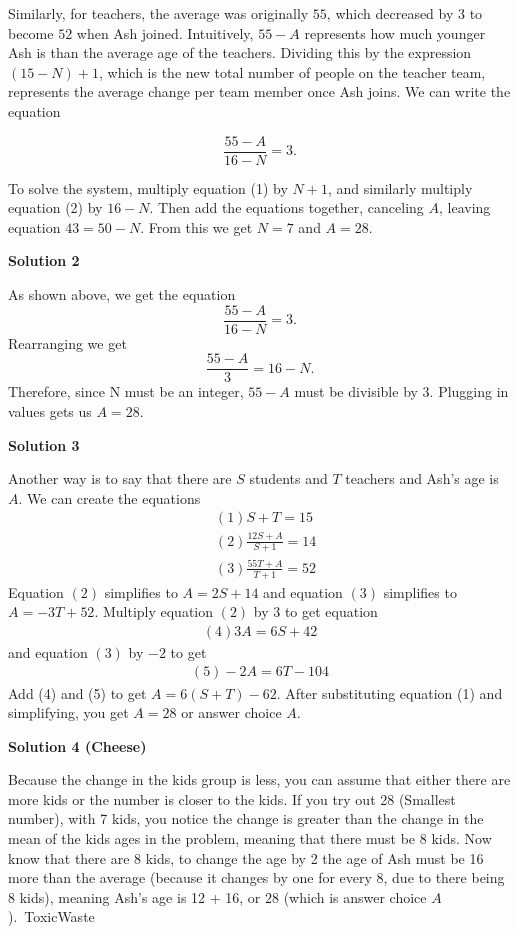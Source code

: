 \begin{enumerate}
 Similarly, for teachers, the average was originally $55$, which decreased by $3$ to become $52$ when Ash joined. Intuitively, $55-A$ represents how much younger Ash is than the average age of the teachers. Dividing this by the expression $(15-N)+1$, which is the new total number of people on the teacher team, represents the average change per team member once Ash joins. We can write the equation

 
 \[\frac{55-A}{16-N} = 3.\]

 To solve the system, multiply equation (1) by $N+1$, and similarly multiply equation (2) by $16-N$. Then add the equations together, canceling $A$, leaving equation $43=50-N$. From this we get $N=7$ and $A= \boxed{28}.$




\textbf{Solution 2}

As shown above, we get the equation 
 \[\frac{55-A}{16-N} = 3.\] Rearranging we get 
 \[\frac{55-A}{3} = 16-N.\] Therefore, since N must be an integer, $55-A$ must be divisible by 3. Plugging in values gets us $A= \boxed{28}.$




\textbf{Solution 3}

Another way is to say that there are $S$ students and $T$ teachers and Ash's age is $A$. We can create the equations\begin{align}&(1) S+T=15 \\&(2) \frac{12S+A}{S+1}=14 \\ &(3) \frac{55T+A}{T+1}=52\end{align}Equation $(2)$ simplifies to $A=2S+14$ and equation $(3)$ simplifies to $A=-3T+52$. Multiply equation $(2)$ by $3$ to get equation \begin{align} (4) 3A=6S+42 \end{align} and equation $(3)$ by $-2$ to get \begin{align}(5) -2A=6T-104 \end{align} Add (4) and (5) to get $A=6(S+T)-62$. After substituting equation (1) and simplifying, you get $A=\boxed{28}$ or answer choice $\boxed{A}$.

 



\textbf{Solution 4 (Cheese)}

Because the change in the kids group is less, you can assume that either there are more kids or the number is closer to the kids. If you try out 28 (Smallest number), with 7 kids, you notice the change is greater than the change in the mean of the kids ages in the problem, meaning that there must be 8 kids. Now know that there are 8 kids, to change the age by 2 the age of Ash must be 16 more than the average (because it changes by one for every 8, due to there being 8 kids), meaning Ash's age is 12 + 16, or $\boxed{28}$ (which is answer choice $\boxed{A}$).~ToxicWaste


\end{enumerate}
